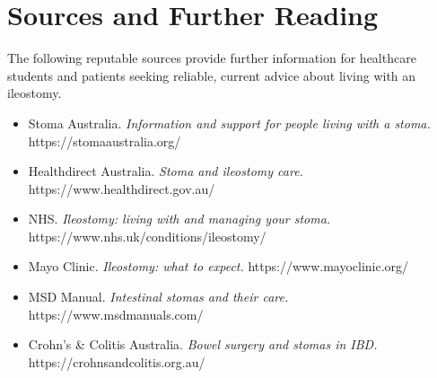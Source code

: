 \section*{Sources and Further Reading}
The following reputable sources provide further information for healthcare students and patients seeking reliable, current advice about living with an ileostomy.
\begin{itemize}
    \item Stoma Australia. \textit{Information and support for people living with a stoma.} https://stomaaustralia.org/
    \item Healthdirect Australia. \textit{Stoma and ileostomy care.} https://www.healthdirect.gov.au/
    \item NHS. \textit{Ileostomy: living with and managing your stoma.} https://www.nhs.uk/conditions/ileostomy/
    \item Mayo Clinic. \textit{Ileostomy: what to expect.} https://www.mayoclinic.org/
    \item MSD Manual. \textit{Intestinal stomas and their care.} https://www.msdmanuals.com/
    \item Crohn's \& Colitis Australia. \textit{Bowel surgery and stomas in IBD.} https://crohnsandcolitis.org.au/
\end{itemize}

